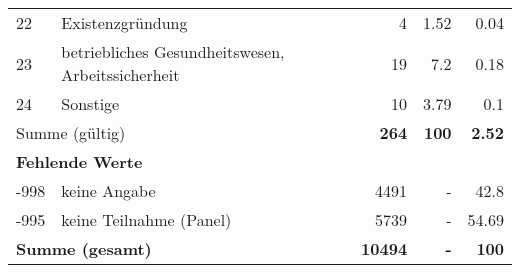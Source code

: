 \begin{longtable}{lXrrr}
        22 & \multicolumn{1}{X}{Existenzgründung} & %
          \num{4} &
          \num[round-mode=places,round-precision=2]{1,52} &
          \num[round-mode=places,round-precision=2]{0,04} \\

        23 & \multicolumn{1}{X}{betriebliches Gesundheitswesen, Arbeitssicherheit} & %
          \num{19} &
          \num[round-mode=places,round-precision=2]{7,2} &
          \num[round-mode=places,round-precision=2]{0,18} \\

        24 & \multicolumn{1}{X}{Sonstige} & %
          \num{10} &
          \num[round-mode=places,round-precision=2]{3,79} &
          \num[round-mode=places,round-precision=2]{0,1} \\

     \midrule
     \multicolumn{2}{l}{Summe (gültig)} &
       \textbf{\num{264}} &
     \textbf{100} &
       \textbf{\num[round-mode=places,round-precision=2]{2,52}} \\
     \multicolumn{5}{l}{\textbf{Fehlende Werte}}\\
       -998 &
       keine Angabe &
         \num{4491} &
        - &
         \num[round-mode=places,round-precision=2]{42,8} \\
       -995 &
       keine Teilnahme (Panel) &
         \num{5739} &
        - &
         \num[round-mode=places,round-precision=2]{54,69} \\
     \midrule
     \multicolumn{2}{l}{\textbf{Summe (gesamt)}} &
          \textbf{\num{10494}} &
        \textbf{-} &
        \textbf{100} \\
     \bottomrule
     \end{longtable}
     
